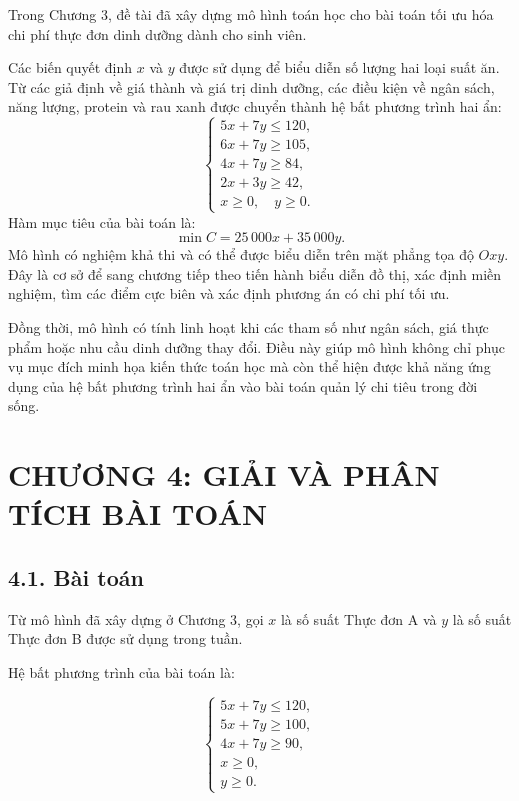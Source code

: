 \documentclass[12pt,a4paper]{article}
\begin{document}
Trong Chương 3, đề tài đã xây dựng mô hình toán học cho bài toán tối ưu hóa chi phí thực đơn dinh dưỡng dành cho sinh viên.

Các biến quyết định $x$ và $y$ được sử dụng để biểu diễn số lượng hai loại suất ăn. Từ các giả định về giá thành và giá trị dinh dưỡng, các điều kiện về ngân sách, năng lượng, protein và rau xanh được chuyển thành hệ bất phương trình hai ẩn:
\[
\left\{
\begin{array}{l}
5x+7y\leq120,\\
6x+7y\geq105,\\
4x+7y\geq84,\\
2x+3y\geq42,\\
x\geq0,\quad y\geq0.
\end{array}
\right.
\]
Hàm mục tiêu của bài toán là:
\[
\boxed{
\min C=25\,000x+35\,000y.
}
\]
Mô hình có nghiệm khả thi và có thể được biểu diễn trên mặt phẳng tọa độ $Oxy$. Đây là cơ sở để sang chương tiếp theo tiến hành biểu diễn đồ thị, xác định miền nghiệm, tìm các điểm cực biên và xác định phương án có chi phí tối ưu.

Đồng thời, mô hình có tính linh hoạt khi các tham số như ngân sách, giá thực phẩm hoặc nhu cầu dinh dưỡng thay đổi. Điều này giúp mô hình không chỉ phục vụ mục đích minh họa kiến thức toán học mà còn thể hiện được khả năng ứng dụng của hệ bất phương trình hai ẩn vào bài toán quản lý chi tiêu trong đời sống.


\newpage

\section*{CHƯƠNG 4: GIẢI VÀ PHÂN TÍCH BÀI TOÁN}

\subsection*{4.1. Bài toán}

Từ mô hình đã xây dựng ở Chương 3, gọi $x$ là số suất Thực đơn A và $y$ là số suất Thực đơn B được sử dụng trong tuần.

Hệ bất phương trình của bài toán là:

\[
\begin{cases}
5x+7y\leq120,\\
5x+7y\geq100,\\
4x+7y\geq90,\\
x\geq0,\\
y\geq0.
\end{cases}
\]
\end{document}
